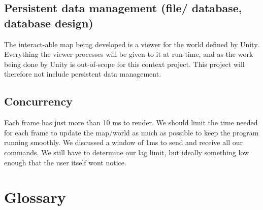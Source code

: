 \documentclass[11pt]{article}
\begin{document}
    \subsection{Persistent data management (file/ database, database design)}
    The interact-able map being developed is a viewer for the world defined by Unity. Everything the viewer processes will be given to it at run-time, and as the work being done by Unity is out-of-scope for this context project. This project will therefore not include persistent data management.
    
    \subsection{Concurrency}
    Each frame has just more than 10 ms to render. We should limit the time needed for each frame to update the map/world as much as possible to keep the program running smoothly. We discussed a window of 1ms to send and receive all our commands. 
    We still have to determine our lag limit, but ideally something low enough that the user itself wont notice. 
    
\newpage

\section{Glossary}
\printglossary[title=]
\end{document}
